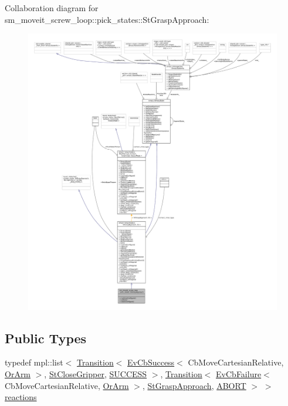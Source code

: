Collaboration diagram for sm\+\_\+moveit\+\_\+screw\+\_\+loop\+:\+:pick\+\_\+states\+:\+:St\+Grasp\+Approach\+:
\nopagebreak
\begin{figure}[H]
\begin{center}
\leavevmode
\includegraphics[width=350pt]{structsm__moveit__screw__loop_1_1pick__states_1_1StGraspApproach__coll__graph}
\end{center}
\end{figure}
\subsection*{Public Types}
\begin{DoxyCompactItemize}
\item 
typedef mpl\+::list$<$ \hyperlink{classsmacc_1_1Transition}{Transition}$<$ \hyperlink{structsmacc_1_1EvCbSuccess}{Ev\+Cb\+Success}$<$ Cb\+Move\+Cartesian\+Relative, \hyperlink{classsm__moveit__screw__loop_1_1OrArm}{Or\+Arm} $>$, \hyperlink{structsm__moveit__screw__loop_1_1pick__states_1_1StCloseGripper}{St\+Close\+Gripper}, \hyperlink{structsmacc_1_1default__transition__tags_1_1SUCCESS}{S\+U\+C\+C\+E\+SS} $>$, \hyperlink{classsmacc_1_1Transition}{Transition}$<$ \hyperlink{structsmacc_1_1EvCbFailure}{Ev\+Cb\+Failure}$<$ Cb\+Move\+Cartesian\+Relative, \hyperlink{classsm__moveit__screw__loop_1_1OrArm}{Or\+Arm} $>$, \hyperlink{structsm__moveit__screw__loop_1_1pick__states_1_1StGraspApproach}{St\+Grasp\+Approach}, \hyperlink{structsmacc_1_1default__transition__tags_1_1ABORT}{A\+B\+O\+RT} $>$ $>$ \hyperlink{structsm__moveit__screw__loop_1_1pick__states_1_1StGraspApproach_a5669f78f47cdc4f12af0b7a62d207b5a}{reactions}
\end{DoxyCompactItemize}
